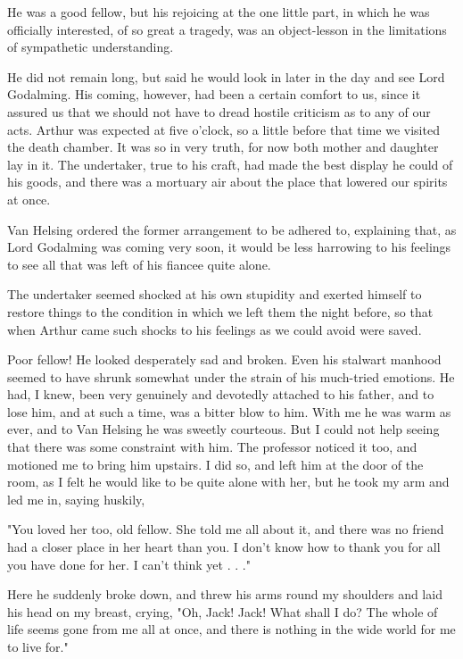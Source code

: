 He was a good fellow, but his rejoicing at the one little part, in which he was officially interested, of so great a tragedy, was an object-lesson in the limitations of sympathetic understanding. 

He did not remain long, but said he would look in later in the day and see Lord Godalming. His coming, however, had been a certain comfort to us, since it assured us that we should not have to dread hostile criticism as to any of our acts. Arthur was expected at five o'clock, so a little before that time we visited the death chamber. It was so in very truth, for now both mother and daughter lay in it. The undertaker, true to his craft, had made the best display he could of his goods, and there was a mortuary air about the place that lowered our spirits at once. 

Van Helsing ordered the former arrangement to be adhered to, explaining that, as Lord Godalming was coming very soon, it would be less harrowing to his feelings to see all that was left of his fiancee quite alone. 

The undertaker seemed shocked at his own stupidity and exerted himself to restore things to the condition in which we left them the night before, so that when Arthur came such shocks to his feelings as we could avoid were saved. 

Poor fellow! He looked desperately sad and broken. Even his stalwart manhood seemed to have shrunk somewhat under the strain of his much-tried emotions. He had, I knew, been very genuinely and devotedly attached to his father, and to lose him, and at such a time, was a bitter blow to him. With me he was warm as ever, and to Van Helsing he was sweetly courteous. But I could not help seeing that there was some constraint with him. The professor noticed it too, and motioned me to bring him upstairs. I did so, and left him at the door of the room, as I felt he would like to be quite alone with her, but he took my arm and led me in, saying huskily, 

"You loved her too, old fellow. She told me all about it, and there was no friend had a closer place in her heart than you. I don't know how to thank you for all you have done for her. I can't think yet . . ." 

Here he suddenly broke down, and threw his arms round my shoulders and laid his head on my breast, crying, "Oh, Jack! Jack! What shall I do? The whole of life seems gone from me all at once, and there is nothing in the wide world for me to live for." 

